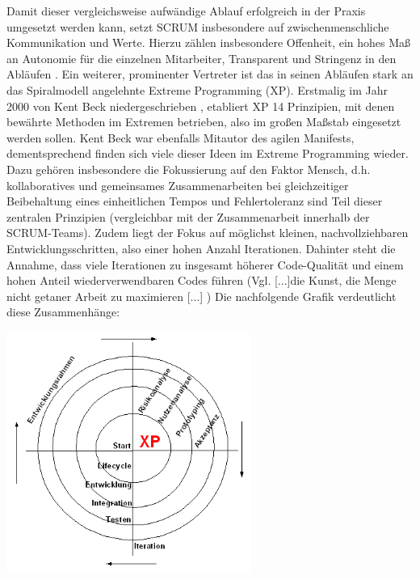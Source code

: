 Damit dieser vergleichsweise aufwändige Ablauf erfolgreich in der Praxis umgesetzt werden kann, setzt \gls{SCRUM} insbesondere auf zwischenmenschliche Kommunikation und Werte. Hierzu zählen insbesondere Offenheit, ein hohes Maß an Autonomie für die einzelnen Mitarbeiter, Transparent und Stringenz in den Abläufen \cite{SCRUM_values_nodate}.\newline
Ein weiterer, prominenter Vertreter ist das in seinen Abläufen stark an das Spiralmodell angelehnte Extreme Programming (\acrshort{XP}). Erstmalig im Jahr 2000 von Kent Beck niedergeschrieben \cite{beck_extreme_2000}, etabliert \acrshort{XP} 14 Prinzipien, mit denen bewährte Methoden \glqq im Extremen\grqq{} betrieben, also im großen Maßstab eingesetzt werden sollen.
Kent Beck war ebenfalls Mitautor des agilen Manifests, dementsprechend finden sich viele dieser Ideen im Extreme Programming wieder. Dazu gehören insbesondere die Fokussierung auf den Faktor Mensch, d.h. kollaboratives und gemeinsames Zusammenarbeiten bei gleichzeitiger Beibehaltung eines einheitlichen Tempos und Fehlertoleranz sind Teil dieser zentralen Prinzipien (vergleichbar mit der Zusammenarbeit innerhalb der \gls{SCRUM}-Teams). Zudem liegt der Fokus auf möglichst kleinen, nachvollziehbaren Entwicklungsschritten, also einer hohen Anzahl Iterationen. Dahinter steht die Annahme, dass viele Iterationen zu insgesamt höherer Code-Qualität und einem hohen Anteil wiederverwendbaren Codes führen (Vgl. \glqq{}[...]die Kunst, die Menge nicht getaner Arbeit zu maximieren [...]\grqq{} \cite{beck_manifest_2001}) Die nachfolgende Grafik verdeutlicht diese Zusammenhänge:

\begin{center}
    \includegraphics[width=0.6\textwidth]{Grafiken/XP-Life.png}
    \label{Grafik:Zyklen des Extreme Programmings}
\end{center}

